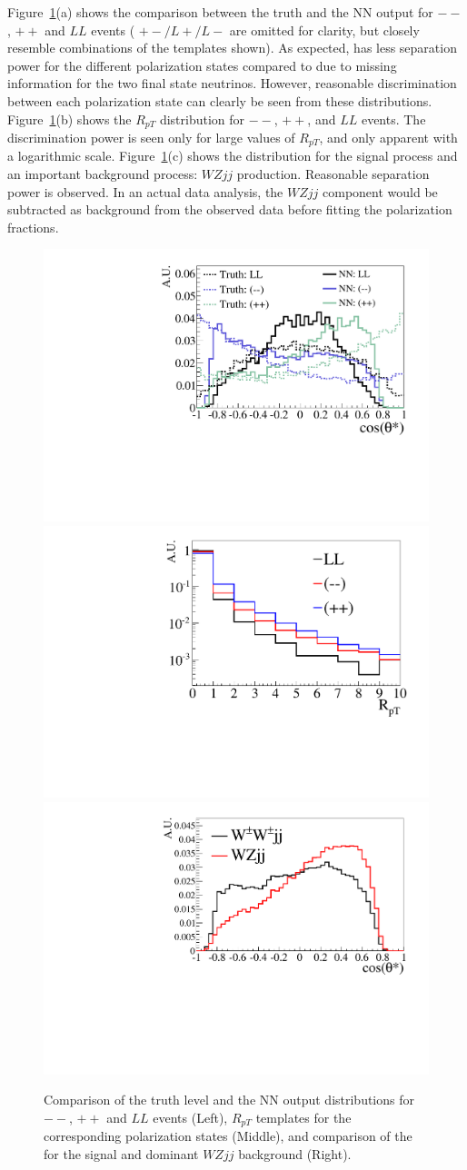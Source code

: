 Figure~\ref{fig:polarization_comparison}(a) shows the comparison between the truth \cts and 
the NN output \ctsNN for $--$, $++$ and $LL$ events ( $+-/L+/L-$ are omitted for clarity, but closely resemble combinations of the templates shown). As expected, \ctsNN has less separation 
power for the different polarization states compared to \cts due to missing information for the two final state neutrinos. 
However, reasonable discrimination between each polarization state can clearly be seen from these distributions. 
Figure~\ref{fig:polarization_comparison}(b) shows the $R_{pT}$ distribution for $--$, $++$, and $LL$ events. 
The discrimination power is seen only for large values of $R_{pT}$, and only apparent with a logarithmic scale. Figure~\ref{fig:polarization_comparison}(c) shows the \ctsNN distribution for the signal \ssWW process and an important background process: $WZjj$ production.  Reasonable separation power is observed. In an actual data analysis, the $WZjj$ component would be subtracted as background
from the observed data before fitting the polarization fractions.

\begin{figure}
\includegraphics[width=.32\textwidth,height=.18\textheight]{./fig/1d_templates_graph_X.pdf}
\includegraphics[width=.32\textwidth,height=.18\textheight]{./fig/ratios_LLRROO_graph.pdf}
\includegraphics[width=.32\textwidth,height=.18\textheight]{./fig/1d_wz_bg_graph_X.pdf}
\caption{\label{fig:polarization_comparison} Comparison of the truth level \cts and the 
NN output \ctsNN distributions for $--$, $++$ and $LL$ events (Left), 
$R_{pT}$ templates for the corresponding polarization states (Middle), 
and comparison of the \ctsNN for the signal and dominant $WZjj$ background (Right).}
\end{figure}

